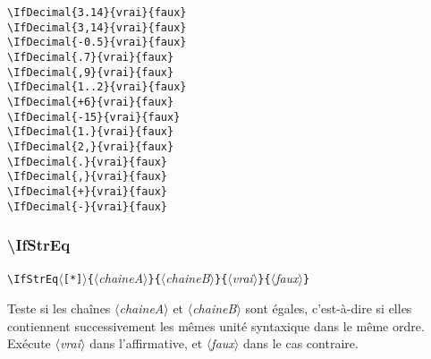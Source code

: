 \documentclass[a4paper,10pt]{article}
\newcommand\argu[1]{$\langle$\textit{#1}$\rangle$}
\newcommand\ARGU[1]{\texttt{\color{black}\{}\argu{#1}\texttt{\color{black}\}}}
\newcommand\etoile{$\langle$\texttt{[*]}$\rangle$}
\newcommand\US{unité syntaxique\xspace}
\newcommand\styleexemple{\small\vskip4pt}
\newcommand\verbinline{\lstinline[basicstyle=\normalsize\ttfamily]}
\begin{document}
\begin{minipage}[t]{0.65\linewidth}
\begin{lstlisting}
\IfDecimal{3.14}{vrai}{faux}
\IfDecimal{3,14}{vrai}{faux}
\IfDecimal{-0.5}{vrai}{faux}
\IfDecimal{.7}{vrai}{faux}
\IfDecimal{,9}{vrai}{faux}
\IfDecimal{1..2}{vrai}{faux}
\IfDecimal{+6}{vrai}{faux}
\IfDecimal{-15}{vrai}{faux}
\IfDecimal{1.}{vrai}{faux}
\IfDecimal{2,}{vrai}{faux}
\IfDecimal{.}{vrai}{faux}
\IfDecimal{,}{vrai}{faux}
\IfDecimal{+}{vrai}{faux}
\IfDecimal{-}{vrai}{faux}
\end{lstlisting}%
\end{minipage}\hfill
\begin{minipage}[t]{0.35\linewidth}
	\styleexemple
	\par
	\par
	\par
	\par
	\par
	\par
	\par
	\par
	\par
	\par
	\par
	\par
	\par
\end{minipage}%

\subsubsection{\ttfamily\textbackslash IfStrEq}

\verbinline|\IfStrEq|\etoile\ARGU{chaineA}\ARGU{chaineB}\ARGU{vrai}\ARGU{faux}
\smallskip

Teste si les chaînes \argu{chaineA} et \argu{chaineB} sont égales, c'est-à-dire si elles contiennent successivement les mêmes \US dans le même ordre. Exécute \argu{vrai} dans l'affirmative, et \argu{faux} dans le cas contraire.\smallskip
\end{document}
